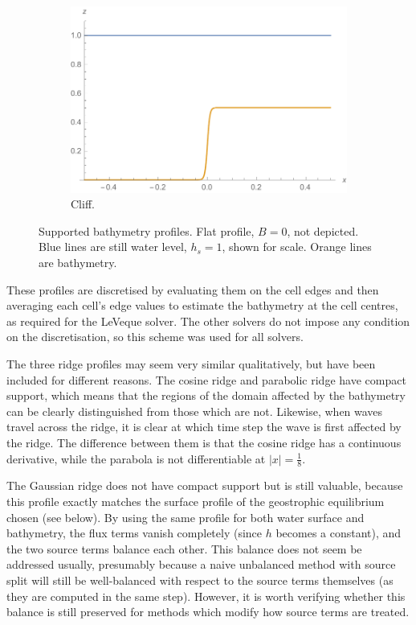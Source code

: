 \begin{figure}
\begin{subfigure}{0.45\textwidth}
    \includegraphics[width=\textwidth]{diagrams/bath-cliff}
    \caption{Cliff.}
    \label{fig:bath-cliff}
  \end{subfigure}
  \caption{Supported bathymetry profiles. Flat profile, $B = 0$, not depicted. Blue lines are still water level, $h_s = 1$, shown for scale. Orange lines are bathymetry.}
  \label{fig:bathymetries}
\end{figure}

These profiles are discretised by evaluating them on the cell edges and then averaging each cell's edge values to estimate the bathymetry at the cell centres, as required for the LeVeque solver. The other solvers do not impose any condition on the discretisation, so this scheme was used for all solvers.

The three ridge profiles may seem very similar qualitatively, but have been included for different reasons. The cosine ridge and parabolic ridge have compact support, which means that the regions of the domain affected by the bathymetry can be clearly distinguished from those which are not. Likewise, when waves travel across the ridge, it is clear at which time step the wave is first affected by the ridge. The difference between them is that the cosine ridge has a continuous derivative, while the parabola is not differentiable at $|x| = \frac{1}{8}$.

The Gaussian ridge does not have compact support but is still valuable, because this profile exactly matches the surface profile of the geostrophic equilibrium chosen (see below). By using the same profile for both water surface and bathymetry, the flux terms vanish completely (since $h$ becomes a constant), and the two source terms balance each other. This balance does not seem be addressed usually, presumably because a naive unbalanced method with source split will still be well-balanced with respect to the source terms themselves (as they are computed in the same step). However, it is worth verifying whether this balance is still preserved for methods which modify how source terms are treated.


